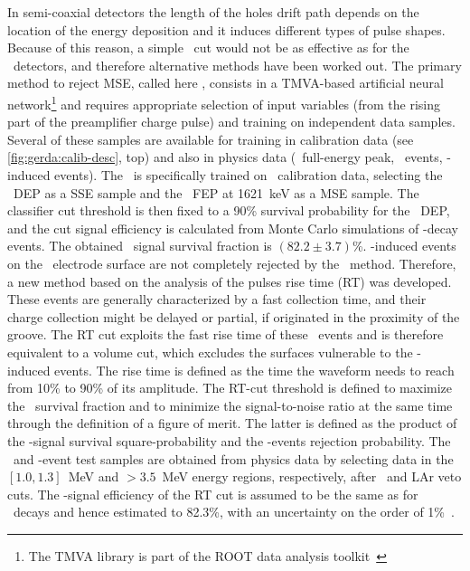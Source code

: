 In semi-coaxial detectors the length of the holes drift path depends on the location of
the energy deposition and it induces different types of pulse shapes. Because of this
reason, a simple \aoe\ cut would not be as effective as for the \bege\ detectors, and
therefore alternative methods have been worked out.
\newpar
The primary method to reject MSE, called here \annmse, consists in a TMVA-based artificial
neural network\footnote{The TMVA library is part of the ROOT data analysis
toolkit~\cite{Brun1997}} and requires appropriate selection of input variables (from the
rising part of the preamplifier charge pulse) and training on independent data samples.
Several of these samples are available for training in calibration data (see
\cref{fig:gerda:calib-desc}, top) and also in physics data (\kvz\ full-energy peak, \nnbb\
events, \a-induced events). The \annmse\ is specifically trained on \Th\ calibration data,
selecting the \Tl\ DEP as a SSE sample and the \Bil\ FEP at 1621~keV as a MSE sample. The
classifier cut threshold is then fixed to a 90\% survival probability for the \Th\ DEP,
and the cut signal efficiency is calculated from Monte Carlo simulations of \onbb-decay
events. The obtained \annmse\ signal survival fraction is $(82.2 \pm 3.7)$\%.
\newpar
\a-induced events on the \pplus\ electrode surface are not completely rejected by the
\annmse\ method. Therefore, a new method based on the analysis of the pulses rise time
(RT) was developed. These events are generally characterized by a fast collection time,
and their charge collection might be delayed or partial, if originated in the proximity of
the groove. The RT cut exploits the fast rise time of these \a\ events and is therefore
equivalent to a volume cut, which excludes the surfaces vulnerable to the \a-induced
events. The rise time is defined as the time the waveform needs to reach from 10\% to 90\%
of its amplitude. The RT-cut threshold is defined to maximize the \onbb\ survival fraction
and to minimize the signal-to-noise ratio at the same time through the definition of a
figure of merit. The latter is defined as the product of the \nnbb-signal survival
square-probability and the \a-events rejection probability. The \nnbb\ and \a-event test
samples are obtained from physics data by selecting data in the $[1.0, 1.3]$~MeV and
$>3.5$~MeV energy regions, respectively, after \annmse\ and LAr veto cuts.  The
\onbb-signal efficiency of the RT cut is assumed to be the same as for \nnbb\ decays
and hence estimated to 82.3\%, with an uncertainty on the order of 1\%~\cite{Lazzaro2019}.

